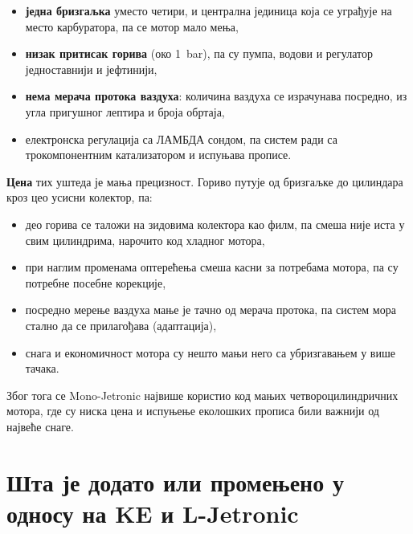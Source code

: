 \documentclass[12pt]{article}
\begin{document}
\begin{itemize}[noitemsep]
    \item \textbf{једна бризгаљка} уместо четири, и централна јединица која се
          уграђује на место карбуратора, па се мотор мало мења,
    \item \textbf{низак притисак горива} (око 1~bar), па су пумпа, водови и
          регулатор једноставнији и јефтинији,
    \item \textbf{нема мерача протока ваздуха}: количина ваздуха се израчунава
          посредно, из угла пригушног лептира и броја обртаја,
    \item електронска регулација са ЛАМБДА сондом, па систем ради са
          трокомпонентним катализатором и испуњава прописе.
\end{itemize}

\textbf{Цена} тих уштеда је мања прецизност. Гориво путује од бризгаљке до
цилиндара кроз цео усисни колектор, па:

\begin{itemize}[noitemsep]
    \item део горива се таложи на зидовима колектора као филм, па смеша није
          иста у свим цилиндрима, нарочито код хладног мотора,
    \item при наглим променама оптерећења смеша касни за потребама мотора, па
          су потребне посебне корекције,
    \item посредно мерење ваздуха мање је тачно од мерача протока, па систем
          мора стално да се прилагођава (адаптација),
    \item снага и економичност мотора су нешто мањи него са убризгавањем у
          више тачака.
\end{itemize}

Због тога се Mono-Jetronic највише користио код мањих четвороцилиндричних
мотора, где су ниска цена и испуњење еколошких прописа били важнији од највеће
снаге.

\section{Шта је додато или промењено у односу на KE и L-Jetronic}
\end{document}

